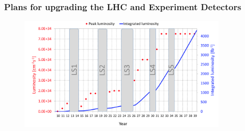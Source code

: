 \begin{frame}
\frametitle{Plans for upgrading the LHC and Experiment Detectors}

\begin{figure}[htbp]
\begin{center}
\includegraphics[width=0.9\textwidth]{images/20170202-rossi-hllhc-1.png}
\end{center}
\end{figure}


\end{frame}


